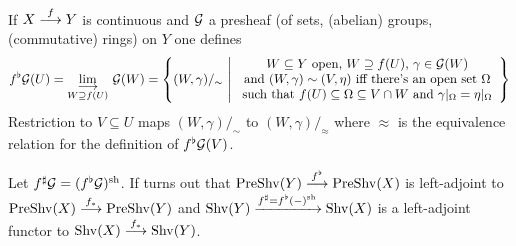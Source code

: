 \documentclass[a4paper,parskip=half,numbers=enddot, DIV=12]{scrreprt}
\begin{document}
    \begin{rem*}
        If $X\morphism[f] Y$ is continuous and $\mathcal{G}$ a presheaf (of sets, (abelian) groups, (commutative) rings) on $Y$ one defines
        \begin{align*}
            f^\flat\Gg(U) = \colimit[W\supseteq f(U)] \Gg(W)=\left\{(W,\gamma)/_\sim\st
            \begin{array}{c}
	            W\subseteq Y\text{ open, }W\supseteq f(U)\text{, }\gamma\in \Gg(W)\\
	            \text{and }(W,\gamma)\sim (V,\eta)\text{ iff there's an open set }\Omega\\
	            \text{such that }f(U)\subseteq \Omega\subseteq V\cap W\text{ and }\gamma|_\Omega=\eta|_\Omega
            \end{array}\right\}
        \end{align*}
        Restriction to $V\subseteq U$ maps $(W,\gamma)/_\sim$ to $(W,\gamma)/_\approx$ where $\approx$ is the equivalence relation for the definition of $f^\flat \mathcal{G}(V)$. 
        
        Let $f^\sharp \mathcal{G}=(f^\flat\mathcal{G})^{\mathrm{sh}}$. If turns out that $\cat{PreShv}(Y)  \morphism[f^\flat] \cat{PreShv}(X)$ is left-adjoint to $\cat{PreShv}(X) \morphism[f_*] \cat{PreShv}(Y)$ and $\operatorname{Shv}(Y)  \xrightarrow{f^\sharp = f^\flat(-)^{\mathrm{sh}}} \operatorname{Shv}(X)$ is a left-adjoint functor to $\cat{Shv}(X) \morphism[f_*] \cat{Shv}(Y)$.
    \end{rem*}
\end{document}
